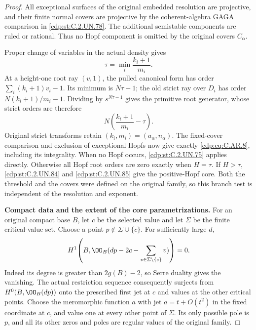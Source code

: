 \begin{proof}
All exceptional surfaces of the original
embedded resolution are projective, and
their finite normal covers are projective
by the coherent-algebra GAGA comparison
in \ref{cdp:st:C.2.UN.78}. The additional semistable
components are ruled or rational.
Thus no Hopf component is omitted by
the original covers \(C_\alpha\).

Proper change of variables in the actual
density gives
\[
                   \tau=\min_i\frac{k_i+1}{m_i}.
 \tag{C.AR.15}\label{cdp:eq:C.AR.15}
\]
At a height-one root ray \((v,1)\),
the pulled canonical form has order
\(\sum_i(k_i+1)v_i-1\). Its minimum
is \(N\tau-1\); the old strict ray
over \(D_i\) has order
\(N(k_i+1)/m_i-1\). Dividing by
\(s^{N\tau-1}\) gives the primitive
root generator, whose strict orders
are therefore
\[
                  N\left(\frac{k_i+1}{m_i}-\tau\right).
 \tag{C.AR.16}\label{cdp:eq:C.AR.16}
\]
Original strict transforms retain
\((k_i,m_i)=(a_\alpha,n_\alpha)\).
The fixed-cover comparison and exclusion
of exceptional Hopfs now give exactly
\eqref{cdp:eq:C.AR.8}, including its integrality.
When no Hopf occurs, \ref{cdp:st:C.2.UN.75} applies
directly. Otherwise all Hopf root
orders are zero exactly when
\(H=\tau\). If \(H>\tau\), \ref{cdp:st:C.2.UN.84}
and \ref{cdp:st:C.2.UN.85} give the positive-Hopf core.
Both the threshold and the covers
were defined on the original family,
so this branch test is independent
of the resolution and exponent.

\par\medskip\noindent\textbf{Compact data and the extent of the core parametrizations.}
For an original compact base \(B\), let
\(c\) be the selected value and let
\(\Sigma\) be the finite critical-value set.
Choose a point \(p\notin\Sigma\cup\{c\}\).
For sufficiently large \(d\),
\[
 H^1\!\left(B,\OO_B(dp-2c-
                    \sum_{v\in\Sigma\setminus\{c\}}v)\right)=0.
\]
Indeed its degree is greater than \(2g(B)-2\),
so Serre duality gives the vanishing. The
actual restriction sequence consequently
surjects from \(H^0(B,\OO_B(dp))\) onto
the prescribed first jet at \(c\) and
values at the other critical points.
Choose the meromorphic function \(a\)
with jet \(a=t+O(t^2)\) in the fixed
coordinate at \(c\), and value one at
every other point of \(\Sigma\).
Its only possible pole is \(p\), and
all its other zeros and poles are regular
values of the original family.


\end{proof}
